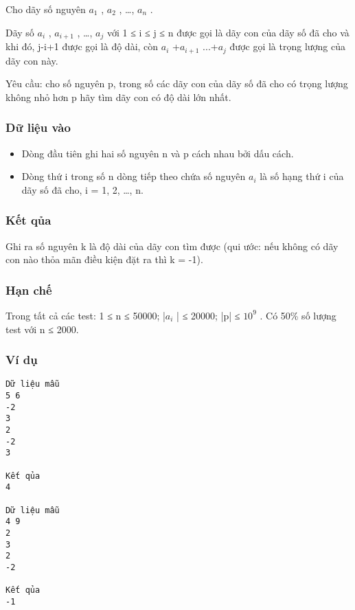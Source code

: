 



   Cho dãy số nguyên $a_{1}$   , $a_{2}$   , …, $a_{n}$   .  

   Dãy số $a_{i}$   , $a_{i+1}$   , …, $a_{j}$   với 1 ≤ i ≤ j ≤ n được gọi là dãy con của dãy số đã cho và khi đó, j-i+1 được gọi là độ dài, còn   $a_{i}$   +$a_{i+1}$   ...+$a_{j}$   được gọi là trọng lượng của dãy con này.  

   Yêu cầu: cho số nguyên p, trong số các dãy con của dãy số đã cho có trọng lượng không nhỏ hơn p hãy tìm dãy con có độ dài lớn nhất.  

\subsubsection{   Dữ liệu vào  }
\begin{itemize}
	\item     Dòng đầu tiên ghi hai số nguyên n và p cách nhau bởi dấu cách.   
	\item     Dòng thứ i trong số n dòng tiếp theo chứa số nguyên $a_{i}$    là số hạng thứ i của dãy số đã  cho, i = 1, 2, …, n.   
\end{itemize}

\subsubsection{   Kết qủa  }

   Ghi ra số nguyên k là độ dài của dãy con tìm được (qui ước: nếu không có dãy con nào thỏa mãn điều kiện đặt ra thì k = -1).  

\subsubsection{   Hạn chế  }

   Trong tất cả các test: 1 ≤ n ≤ 50000;  |$a_{i}$   | ≤ 20000; |p| ≤ $10^{9}$   . Có 50\% số lượng test với n ≤ 2000.  

\subsubsection{   Ví dụ  }
\begin{verbatim}
Dữ liệu mẫu
5 6
-2
3
2
-2
3

Kết qủa
4

Dữ liệu mẫu
4 9
2
3
2
-2

Kết qủa
-1
\end{verbatim}
